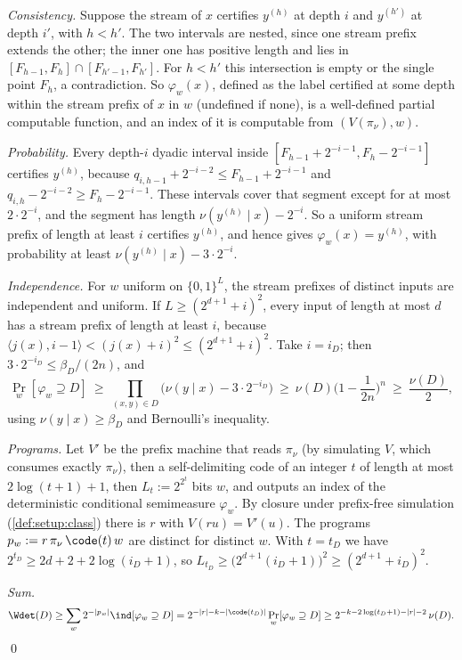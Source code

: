 \emph{Consistency.} Suppose the stream of $x$ certifies $y^{(h)}$ at depth $i$ and $y^{(h')}$ at depth $i'$, with $h<h'$. The two intervals are nested, since one stream prefix extends the other; the inner one has positive length and lies in $[F_{h-1},F_h]\cap[F_{h'-1},F_{h'}]$. For $h<h'$ this intersection is empty or the single point $F_h$, a contradiction. So $\varphi_w(x)$, defined as the label certified at some depth within the stream prefix of $x$ in $w$ (undefined if none), is a well-defined partial computable function, and an index of it is computable from $(V(\pi_\nu),w)$.

\emph{Probability.} Every depth-$i$ dyadic interval inside $[F_{h-1}+2^{-i-1},F_h-2^{-i-1}]$ certifies $y^{(h)}$, because $q_{i,h-1}+2^{-i-2}\le F_{h-1}+2^{-i-1}$ and $q_{i,h}-2^{-i-2}\ge F_h-2^{-i-1}$. These intervals cover that segment except for at most $2\cdot2^{-i}$, and the segment has length $\nu(y^{(h)}\mid x)-2^{-i}$. So a uniform stream prefix of length at least $i$ certifies $y^{(h)}$, and hence gives $\varphi_w(x)=y^{(h)}$, with probability at least $\nu(y^{(h)}\mid x)-3\cdot2^{-i}$.

\emph{Independence.} For $w$ uniform on $\{0,1\}^L$, the stream prefixes of distinct inputs are independent and uniform. If $L\ge(2^{d+1}+i)^2$, every input of length at most $d$ has a stream prefix of length at least $i$, because $\langle j(x),i-1\rangle<(j(x)+i)^2\le(2^{d+1}+i)^2$. Take $i=i_D$; then $3\cdot2^{-i_D}\le\beta_D/(2n)$, and
\[
\Pr_w[\varphi_w\supseteq D]\ \ge\ \prod_{(x,y)\in D}\big(\nu(y\mid x)-3\cdot2^{-i_D}\big)\ \ge\ \nu(D)\Big(1-\frac1{2n}\Big)^n\ \ge\ \frac{\nu(D)}2,
\]
using $\nu(y\mid x)\ge\beta_D$ and Bernoulli's inequality.

\emph{Programs.} Let $V'$ be the prefix machine that reads $\pi_\nu$ (by simulating $V$, which consumes exactly $\pi_\nu$), then a self-delimiting code of an integer $t$ of length at most $2\log(t+1)+1$, then $L_t:=2^{2^t}$ bits $w$, and outputs an index of the deterministic conditional semimeasure $\varphi_w$. By closure under prefix-free simulation (\cref{def:setup:class}) there is $r$ with $V(ru)=V'(u)$. The programs $p_w:=r\,\pi_\nu\,\code(t)\,w$ are distinct for distinct $w$. With $t=t_D$ we have $2^{t_D}\ge2d+2+2\log(i_D+1)$, so $L_{t_D}\ge\big(2^{d+1}(i_D+1)\big)^2\ge(2^{d+1}+i_D)^2$.

\emph{Sum.}
\[
\Wdet(D)\ge\sum_w2^{-|p_w|}\ind[\varphi_w\supseteq D]=2^{-|r|-k-|\code(t_D)|}\Pr_w[\varphi_w\supseteq D]\ge2^{-k-2\log(t_D+1)-|r|-2}\,\nu(D).
\]
\qed

